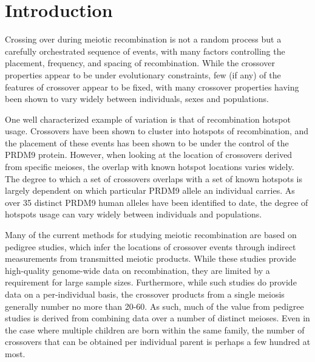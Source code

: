 

\section{Introduction}

Crossing over during meiotic recombination is not a random process but a carefully orchestrated sequence of events, with many factors controlling the placement, frequency, and spacing of recombination.
While the crossover properties appear to be under evolutionary constraints, few (if any) of the features of crossover appear to be fixed, with many crossover properties having been shown to vary widely between individuals, sexes and populations.

One well characterized example of variation is that of recombination hotspot usage.
Crossovers have been shown to cluster into hotspots of recombination\cite{Myers2005,hapmap2007}, and the placement of these events has been shown to be under the control of the PRDM9 protein\cite{Baudat2010,Myers2010,Parvanov2010}.
However, when looking at the location of crossovers derived from specific meioses, the overlap with known hotspot locations varies widely\cite{Coop2008}.
The degree to which a set of crossovers overlaps with a set of known hotspots is largely dependent on which particular PRDM9 allele an individual carries.
As over 35 distinct PRDM9 human alleles have been identified to date, the degree of hotspots usage can vary widely between individuals and populations\cite{Baudat2010,Hinch2011}.

Many of the current methods for studying meiotic recombination are based on pedigree studies, which infer the locations of crossover events through indirect measurements from transmitted meiotic products.
While these studies provide high-quality genome-wide data on recombination, they are limited by a requirement for large sample sizes.
Furthermore, while such studies do provide data on a per-individual basis, the crossover products from a single meiosis generally number no more than 20-60\cite{Lynn2004,Coop2008}.
As such, much of the value from pedigree studies is derived from combining data over a number of distinct meioses.
Even in the case where multiple children are born within the same family, the number of crossovers that can be obtained per individual parent is perhaps a few hundred at most.

